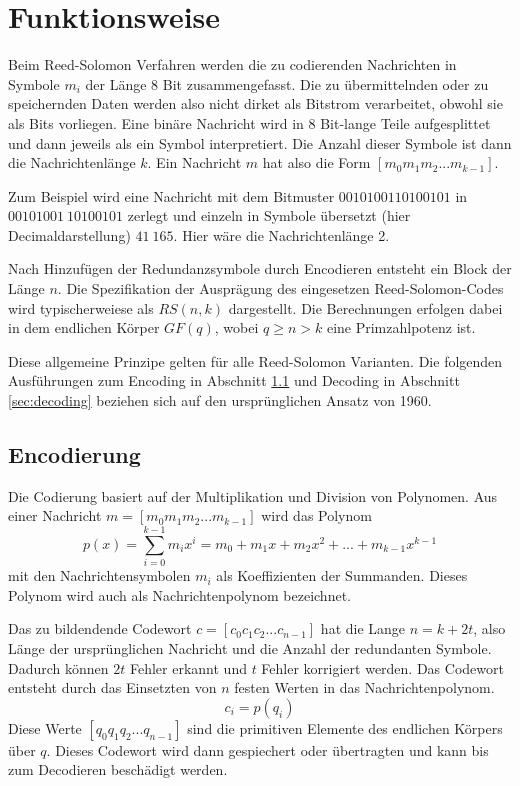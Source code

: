 \chapter{Funktionsweise}\label{ch:operatingPrinciple}

Beim Reed-Solomon Verfahren werden die zu codierenden Nachrichten in Symbole $m_{i}$ der Länge 8 Bit zusammengefasst.
Die zu übermittelnden oder zu speichernden Daten werden also nicht dirket als Bitstrom verarbeitet, obwohl sie als Bits vorliegen.
Eine binäre Nachricht wird in 8 Bit-lange Teile aufgesplittet und dann jeweils als ein Symbol interpretiert.
Die Anzahl dieser Symbole ist dann die Nachrichtenlänge $k$.
Ein Nachricht $m$ hat also die Form $[m_{0}m_{1}m_{2}...m_{k-1}]$.

Zum Beispiel wird eine Nachricht mit dem Bitmuster $0010100110100101$ in $00101001\ 10100101$ zerlegt und einzeln in Symbole übersetzt (hier Decimaldarstellung) $41\ 165$. Hier wäre die Nachrichtenlänge 2.

Nach Hinzufügen der Redundanzsymbole durch Encodieren entsteht ein Block der Länge $n$.
Die Spezifikation der Ausprägung des eingesetzen Reed-Solomon-Codes wird typischerweiese als $RS(n, k)$ dargestellt.
Die Berechnungen erfolgen dabei in dem endlichen Körper $GF(q)$, wobei $q\geq n>k$ eine Primzahlpotenz ist.

Diese allgemeine Prinzipe gelten für alle Reed-Solomon Varianten. Die folgenden Ausführungen zum Encoding in Abschnitt \ref{sec:encoding} und Decoding in Abschnitt \ref{sec:decoding} beziehen sich auf den ursprünglichen Ansatz von 1960.

\section{Encodierung}\label{sec:encoding}

Die Codierung basiert auf der Multiplikation und Division von Polynomen. 
Aus einer Nachricht  $m=[m_{0}m_{1}m_{2}...m_{k-1}]$ wird das Polynom \[p(x)=\sum_{i=0}^{k-1}m_ix^i=m_0+m_1x+m_2x^2+...+m_{k-1}x^{k-1}\] mit den Nachrichtensymbolen $m_i$ als Koeffizienten der Summanden.
Dieses Polynom wird auch als Nachrichtenpolynom bezeichnet.

Das zu bildendende Codewort $c=[c_{0}c_{1}c_{2}...c_{n-1}]$ hat die Lange $n=k+2t$, also Länge der ursprünglichen Nachricht und die Anzahl der redundanten Symbole. Dadurch können $2t$ Fehler erkannt und $t$ Fehler korrigiert werden.
Das Codewort entsteht durch das Einsetzten von $n$ festen Werten in das Nachrichtenpolynom.
\[c_i=p(q_i)\]
Diese Werte $[q_0 q_1 q_2...q_{n-1}]$ sind die primitiven Elemente des endlichen Körpers über $q$.
Dieses Codewort wird dann gespiechert oder übertragten und kann bis zum Decodieren beschädigt werden.

